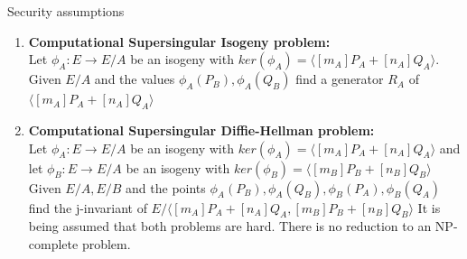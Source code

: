 \documentclass{beamer}
\begin{document}
\begin{frame}{Security assumptions} %
\begin{enumerate}[1.]
	\item \textbf{Computational Supersingular Isogeny problem:}\\
	Let $\phi_A:E\to E/A$ be an isogeny with $ker(\phi_A)=\langle [m_A]P_A+[n_A]Q_A\rangle$. Given $E/A$ and the values $\phi_A(P_B),\phi_A(Q_B)$ find a generator $R_A$ of $\langle [m_A]P_A+[n_A]Q_A\rangle$\pause
	\vspace{5mm}
	\item \textbf{Computational Supersingular Diffie-Hellman problem:}\\ 
	Let $\phi_A:E\to E/A$ be an isogeny with $ker(\phi_A)=\langle [m_A]P_A+[n_A]Q_A\rangle$ and let $\phi_B:E\to E/A$ be an isogeny with $ker(\phi_B)=\langle [m_B]P_B+[n_B]Q_B\rangle$
	Given $E/A,E/B$ and the points $\phi_A(P_B),\phi_A(Q_B),\phi_B(P_A),\phi_B(Q_A)$ find the j-invariant of $E/\langle [m_A]P_A+[n_A]Q_A,[m_B]P_B+[n_B]Q_B \rangle$\pause
	\vfill
	It is being assumed that both problems are hard. There is no reduction to an NP-complete problem.
\end{enumerate}
\end{frame}
\end{document}
